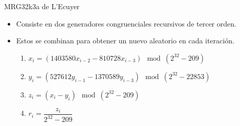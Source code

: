 \begin{frame}{MRG32k3a de L'Ecuyer}
    \begin{itemize}
        \item Consiste en dos generadores congruenciales recursivos de tercer orden.
        \item Estos se combinan para obtener un nuevo aleatorio en cada iteración.
        \begin{enumerate}
        \item $x_i=\left(1403580 x_{i-2}-810728 x_{i-3}\right) \mod \left(2^{32}-209\right)$
        \item $y_i=\left(527612 y_{i-1}-1370589 y_{i-3}\right) \mod \left(2^{32}-22853\right)$
        \item $z_i=\left(x_{i}-y_{i}\right) \mod \left(2^{32}-209\right)$
        \item $r_i=\dfrac{z_i}{2^{32}-209}$
    \end{enumerate}
    \end{itemize}


\end{frame}